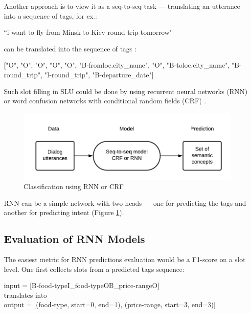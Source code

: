 \documentclass[12pt,titlepage,a4paper]{article}
\begin{document}
Another approach is to view it as a seq-to-seq task ---  translating an utterance into a sequence of tags, for ex.:

\begin{center}
    ``i want to fly from Minsk to Kiev round trip tomorrow" 
\end{center}

can be translated into the sequence of tags \cite{IOB}: 
\begin{center}
    ["O", "O", "O", "O", "O", "B-fromloc.city\_name", "O", "B-toloc.city\_name", "B-round\_trip", "I-round\_trip", "B-departure\_date"]
\end{center}

Such slot filling in SLU could be done by using recurrent neural networks (RNN) or word confusion networks with conditional random fields (CRF) \cite{CRF}.
\begin{figure}[!h]
    \centering
    \includegraphics[width=0.91\linewidth]{training-2-2.png}
    \caption{Classification using RNN or CRF}
    \label{fig:semantic-decoding-seq2seq}
\end{figure}

RNN \cite{SemanticFilling} can be a simple network with two heads --- one for predicting the tags and another for predicting intent (Figure \ref{fig:semantic-decoding-seq2seq}).

\subsection{Evaluation of RNN Models}

The easiest metric for RNN predictions evaluation would be a F1-score on a slot level. One first collects slots from a predicted tags sequence:
\begin{center}
    input = [B-food-type\quad I\_food-type\quad O\quad B\_price-range\quad O] \\
    translates into \\
    output = [(food-type, start=0, end=1), (price-range, start=3, end=3)]
\end{center}
\end{document}
